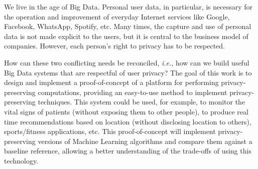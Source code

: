 We live in the age of Big Data. Personal user data, in particular, is necessary for the operation and improvement of everyday Internet services like Google, Facebook, WhatsApp, Spotify, etc. Many times, the capture and use of personal data is not made explicit to the users, but it is central to the business model of companies. However, each person’s right to privacy has to be respected.

How can these two conflicting needs be reconciled, \textit{i.e.}, how can we build useful Big Data systems that are respectful of user privacy?
The goal of this work is to design and implement a proof-of-concept of a platform for performing privacy-preserving computations, providing an easy-to-use method to implement privacy-preserving techniques. This system could be used, for example, to monitor the vital signs of patients (without exposing them to other people), to produce real time recommendations based on location (without disclosing location to others), sports/fitness applications, etc.
This proof-of-concept will implement privacy-preserving versions of Machine Learning algorithms and compare them against a baseline reference, allowing a better understanding of the trade-offs of using this technology.

\newpage

